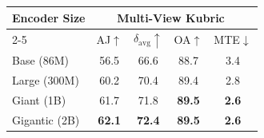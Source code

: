 \begin{tabular}{l cccc}
\toprule
\multirow{2}{*}{Encoder Size}
  & \multicolumn{4}{c}{Multi-View Kubric~\cite{rajic2025mvtracker}} \\
\cmidrule(lr){2-5}
  & AJ$\uparrow$ & $\delta_\text{avg}\uparrow$ & OA$\uparrow$ & MTE$\downarrow$ \\
\midrule
\rowcolor{rowgray}
Base (86M) & 56.5 & 66.6 & 88.7 & 3.4 \\
Large (300M) & 60.2 & 70.4 & 89.4 & 2.8 \\
\rowcolor{rowgray}
Giant (1B) & 61.7 & 71.8 & \textbf{89.5} & \textbf{2.6} \\
Gigantic (2B) & \textbf{62.1} & \textbf{72.4} & \textbf{89.5} & \textbf{2.6} \\
\bottomrule
\end{tabular}
